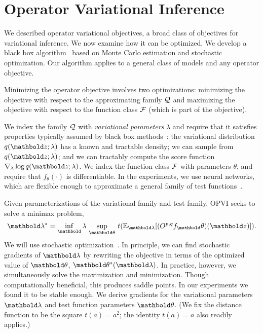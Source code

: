\section{Operator Variational Inference}
\label{sec:inference}
\glsresetall

We described operator variational objectives, a broad class of
objectives for variational inference.
We now examine how it can be optimized.
We develop a black box algorithm~\citep{Wingate:2013, Ranganath:2014}
based on Monte Carlo estimation and stochastic optimization.
Our algorithm applies to a general class of models and any
operator objective.

Minimizing the operator objective involves two optimizations:
minimizing the objective with respect to the approximating family
$\mathcal{Q}$ and maximizing the objective with respect to the function class
$\mathcal{F}$ (which is part of the objective).

We index the family $\mathcal{Q}$
with \textit{variational parameters} $\lambda$ and require that it
satisfies properties typically assumed by black box
methods~\citep{Ranganath:2014}: the variational distribution $q(\mbz ;
\lambda)$ has a known and tractable density; we can sample from
$q(\mbz ; \lambda)$; and we can tractably compute the score function
$\nabla_\lambda \log q(\mbz ; \lambda)$.
We index the function class $\mathcal{F}$ with parameters $\theta$, and
require that $f_\theta(\cdot)$ is differentiable. In the experiments,
we
use neural networks, which are flexible enough to approximate a
general family of test functions~\citep{Hornik:1989}.

Given parameterizations of the variational family and test family,
\gls{OPVI} seeks to solve a minimax problem,
\begin{align}
  \mblambda^* = \inf_\mblambda \, \sup_{\mbtheta} \, t(\E_{\mblambda} [(O^{p,q} f_\mbtheta)(\mbz)]).
\end{align}
We will use stochastic optimization~\citep{Robbins:1951,Kushner:1997}.
In principle, we can find stochastic gradients of $\mblambda$ by
rewriting the objective in terms of the optimized value of $\mbtheta$,
$\mbtheta^*(\mblambda)$. In practice, however, we simultaneously solve
the maximization and minimization. Though computationally
beneficial, this produces saddle points. In our experiments we found
it to be stable enough.
We derive gradients
for the variational parameters $\mblambda$ and test function
parameters $\mbtheta$.  (We fix the distance function to be
the square $t(a) = a^2$; the identity $t(a)=a$ also readily
applies.)

